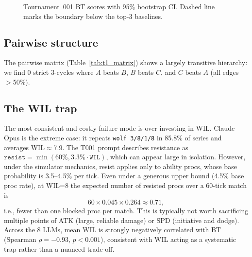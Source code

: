 \documentclass[11pt]{article}
\newcommand{\tOne}{T001}
\begin{document}
\begin{figure}[t]
\centering
{}
\caption{Tournament~001 BT scores with 95\% bootstrap CI. Dashed line marks the boundary below the top-3 baselines.}
\label{fig:t1_bt}
\end{figure}

\subsection{Pairwise structure}

The pairwise matrix (Table~\ref{tab:t1_matrix}) shows a largely transitive hierarchy: we find 0 strict 3-cycles where $A$ beats $B$, $B$ beats $C$, and $C$ beats $A$ (all edges $>$50\%).

\subsection{The WIL trap}

The most consistent and costly failure mode is over-investing in WIL.
Claude Opus is the extreme case: it repeats \texttt{wolf 3/8/1/8} in 85.8\% of series and averages WIL$\approx$7.9.
The \tOne{} prompt describes resistance as $\texttt{resist}=\min(60\%,3.3\%\cdot\texttt{WIL})$, which can appear large in isolation.
However, under the simulator mechanics, resist applies only to ability procs, whose base probability is 3.5--4.5\% per tick.
Even under a generous upper bound (4.5\% base proc rate), at WIL=8 the expected number of resisted procs over a 60-tick match is
\[
60 \times 0.045 \times 0.264 \approx 0.71,
\]
i.e., fewer than one blocked proc per match.
This is typically not worth sacrificing multiple points of ATK (large, reliable damage) or SPD (initiative and dodge).
Across the 8 LLMs, mean WIL is strongly negatively correlated with BT (Spearman $\rho=-0.93$, $p<0.001$), consistent with WIL acting as a systematic trap rather than a nuanced trade-off.
\end{document}
